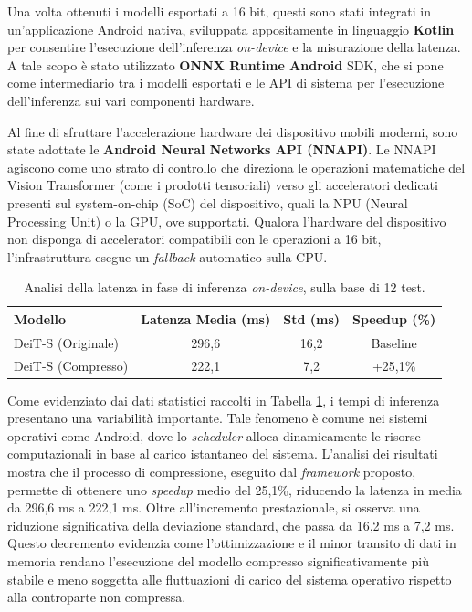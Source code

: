 Una volta ottenuti i modelli esportati a 16 bit, questi sono stati integrati in
un'applicazione Android nativa, sviluppata appositamente in linguaggio
\textbf{Kotlin} per consentire l'esecuzione dell'inferenza \textit{on-device} e
la misurazione della latenza. A tale scopo è stato utilizzato \textbf{ONNX
    Runtime Android} SDK, che si pone come intermediario tra i modelli esportati e
le API di sistema per l'esecuzione dell'inferenza sui vari componenti hardware. \par

Al fine di sfruttare l'accelerazione hardware dei dispositivo mobili moderni,
sono state adottate le \textbf{Android Neural Networks API (NNAPI)}. Le NNAPI
agiscono come uno strato di controllo che direziona le operazioni matematiche
del Vision Transformer (come i prodotti tensoriali) verso gli acceleratori
dedicati presenti sul system-on-chip (SoC) del dispositivo, quali la NPU
(Neural Processing Unit) o la GPU, ove supportati. Qualora l'hardware del
dispositivo non disponga di acceleratori compatibili con le operazioni a 16
bit, l'infrastruttura esegue un \textit{fallback} automatico sulla CPU. \par

\begin{table}[H]
    \centering
    \begin{tabular}{lccc}
        \hline
        \textbf{Modello}   & \textbf{Latenza Media (ms)} & \textbf{Std (ms)} & \textbf{Speedup (\%)} \\ \hline
        DeiT-S (Originale) & 296,6                       & 16,2              & Baseline              \\
        DeiT-S (Compresso) & 222,1                       & 7,2               & +25,1\%               \\ \hline
    \end{tabular}
    \vspace{10pt}
    \caption{Analisi della latenza in fase di inferenza \textit{on-device}, sulla base di 12 test.}
    \label{tab:benchmark_mobile}
\end{table}

Come evidenziato dai dati statistici raccolti in Tabella
\ref{tab:benchmark_mobile}, i tempi di inferenza presentano una variabilità
importante. Tale fenomeno è comune nei sistemi operativi come Android, dove lo
\textit{scheduler} alloca dinamicamente le risorse computazionali in base al
carico istantaneo del sistema. L'analisi dei risultati mostra che il processo
di compressione, eseguito dal \textit{framework} proposto, permette di ottenere
uno \textit{speedup} medio del 25,1\%, riducendo la latenza in media da 296,6
ms a 222,1 ms. Oltre all'incremento prestazionale, si osserva una riduzione
significativa della deviazione standard, che passa da 16,2 ms a 7,2 ms. Questo
decremento evidenzia come l'ottimizzazione e il minor transito di dati in
memoria rendano l'esecuzione del modello compresso significativamente più
stabile e meno soggetta alle fluttuazioni di carico del sistema operativo
rispetto alla controparte non compressa.

